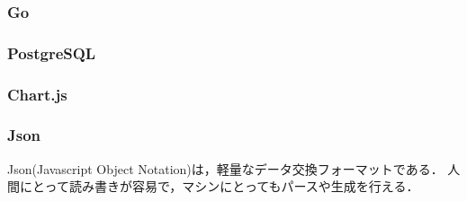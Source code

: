 \subsubsection{Go}


\subsubsection{PostgreSQL}


\subsubsection{Chart.js}


\subsubsection{Json}
Json\cite{json}(Javascript Object Notation)は，軽量なデータ交換フォーマットである．
人間にとって読み書きが容易で，マシンにとってもパースや生成を行える．